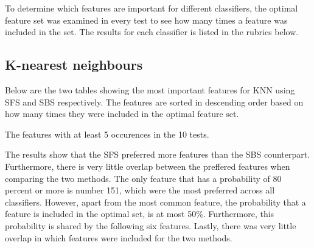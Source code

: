 \documentclass{kththesis}
\begin{document}
To determine which features are important for different classifiers, the optimal feature set was examined in every test to see how many times a feature was included in the set. The results for each classifier is listed in the rubrics below.

\subsection{K-nearest neighbours}

Below are the two tables showing the most important features for KNN using SFS and SBS respectively. The features are sorted in descending order based on how many times they were included in the optimal feature set.

\begin{table}[h!]
  \begin{center}
    \caption{The features with at least 5 occurences in the 10 tests.}
  \end{center}
\end{table}

The results show that the SFS preferred more features than the SBS counterpart. Furthermore, there is very little overlap between the preffered features when comparing the two methods. The only feature that has a probability of 80 percent or more is number 151, which were the most preferred across all classifiers. However, apart from the most common feature, the probability that a feature is included in the optimal set, is at most 50\%. Furthermore, this probability is shared by the following six features. Lastly, there was very little overlap in which features were included for the two methods.
\end{document}
